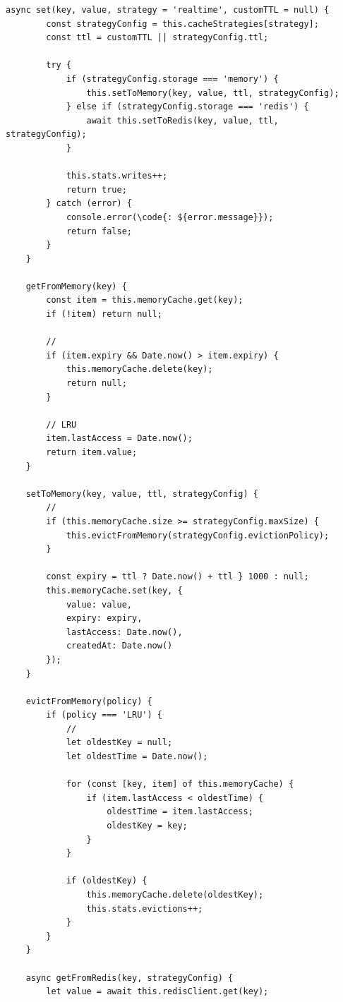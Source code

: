 \begin{lstlisting}[style=javascript]
    async set(key, value, strategy = 'realtime', customTTL = null) {
        const strategyConfig = this.cacheStrategies[strategy];
        const ttl = customTTL || strategyConfig.ttl;
        
        try {
            if (strategyConfig.storage === 'memory') {
                this.setToMemory(key, value, ttl, strategyConfig);
            } else if (strategyConfig.storage === 'redis') {
                await this.setToRedis(key, value, ttl, strategyConfig);
            }
            
            this.stats.writes++;
            return true;
        } catch (error) {
            console.error(\code{: ${error.message}});
            return false;
        }
    }
    
    getFromMemory(key) {
        const item = this.memoryCache.get(key);
        if (!item) return null;
        
        // 
        if (item.expiry && Date.now() > item.expiry) {
            this.memoryCache.delete(key);
            return null;
        }
        
        // LRU
        item.lastAccess = Date.now();
        return item.value;
    }
    
    setToMemory(key, value, ttl, strategyConfig) {
        // 
        if (this.memoryCache.size >= strategyConfig.maxSize) {
            this.evictFromMemory(strategyConfig.evictionPolicy);
        }
        
        const expiry = ttl ? Date.now() + ttl } 1000 : null;
        this.memoryCache.set(key, {
            value: value,
            expiry: expiry,
            lastAccess: Date.now(),
            createdAt: Date.now()
        });
    }
    
    evictFromMemory(policy) {
        if (policy === 'LRU') {
            // 
            let oldestKey = null;
            let oldestTime = Date.now();
            
            for (const [key, item] of this.memoryCache) {
                if (item.lastAccess < oldestTime) {
                    oldestTime = item.lastAccess;
                    oldestKey = key;
                }
            }
            
            if (oldestKey) {
                this.memoryCache.delete(oldestKey);
                this.stats.evictions++;
            }
        }
    }
    
    async getFromRedis(key, strategyConfig) {
        let value = await this.redisClient.get(key);
        

\end{lstlisting}
